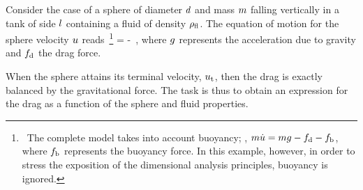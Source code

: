 \begin{example}
Consider the case of a sphere of diameter $d$ and mass $m$ falling vertically in a tank of side $l$ containing a fluid of density $\rho_\text{fl}$. The equation of motion for the sphere velocity $u$ reads~\footnote{~The complete model takes into account buoyancy; \ie, $m \dot{u} = mg - f_\text{d} - f_\text{b}$, where $f_\text{b}$ represents the buoyancy force. In this example, however, in order to stress the exposition of the dimensional analysis principles, buoyancy is ignored.}
\beq
\mass \dt\vel = \mass\grav - \drag\,,
\eeq
where $g$ represents the acceleration due to gravity and $f_\text{d}$ the drag force. 

When the sphere attains its terminal velocity, $u_\text{t}$, then the drag is exactly balanced by the gravitational force. The task is thus to obtain an expression for the drag as a function of the sphere and fluid properties.
\end{example}

